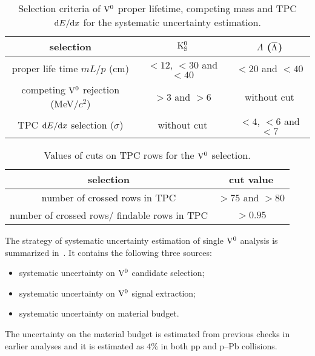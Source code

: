 \begin{table}[htdp]
\begin{center}
\begin{tabular}{|c|c|c|}
\hline
selection & ${\rm K}_{\rm S}^{0}$ & $\Lambda$ ($\overline{\Lambda}$) \\
\hline
proper life time $mL/p$ (cm) &
$<12$, $<30$ and $<40$ & $<20$ and $<40$ \\
\hline
competing ${\rm V}^{0}$ rejection (MeV/$c^{2}$) &
$>3$ and $>6$          & without cut \\
\hline
TPC ${\rm d}E/{\rm d}x$ selection ($\sigma$) &
without cut            & $<4$, $<6$ and $<7$ \\
\hline
\end{tabular}
\end{center}
\caption{Selection criteria of ${\rm V}^{0}$ proper lifetime, competing mass and
TPC ${\rm d}E/{\rm d}x$ for the systematic uncertainty estimation.}
\label{tab:c06PropComp}
\end{table}

\begin{table}[htdp]
\begin{center}
\begin{tabular}{|c|c|}
\hline
selection & cut value \\
\hline
number of crossed rows in TPC                & $>75$ and $>80$ \\
\hline
number of crossed rows/ findable rows in TPC & $>0.95$ \\
\hline
\end{tabular}
\end{center}
\caption{Values of cuts on TPC rows for the ${\rm V}^{0}$ selection.}
\label{tab:c06RowsTPC}
\end{table}

The strategy of systematic uncertainty estimation of single ${\rm V}^{0}$
analysis is summarized in~\cite{Ali2012:ana501}.
It contains the following three sources:
\begin{itemize}
\item systematic uncertainty on ${\rm V}^{0}$ candidate selection;
\item systematic uncertainty on ${\rm V}^{0}$ signal extraction;
\item systematic uncertainty on material budget.
\end{itemize}
The uncertainty on the material budget is estimated from previous checks in
earlier analyses and it is estimated as $4\%$ in both pp and p--Pb collisions.

